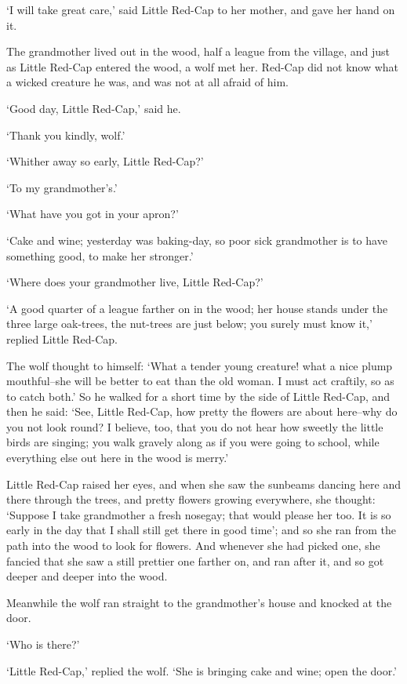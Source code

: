 \documentclass[oneside,11pt]{memoir} %
\begin{document}
`I will take great care,' said Little Red-Cap to her mother, and gave her hand on it.

The grandmother lived out in the wood, half a league from the village, and just as Little Red-Cap entered the wood, a wolf met her. Red-Cap did not know what a wicked creature he was, and was not at all afraid of him.

`Good day, Little Red-Cap,' said he.

`Thank you kindly, wolf.'

`Whither away so early, Little Red-Cap?'

`To my grandmother's.'

`What have you got in your apron?'

`Cake and wine; yesterday was baking-day, so poor sick grandmother is to have something good, to make her stronger.'

`Where does your grandmother live, Little Red-Cap?'

`A good quarter of a league farther on in the wood; her house stands under the three large oak-trees, the nut-trees are just below; you surely must know it,' replied Little Red-Cap.

The wolf thought to himself: `What a tender young creature! what a nice plump mouthful--she will be better to eat than the old woman. I must act craftily, so as to catch both.' So he walked for a short time by the side of Little Red-Cap, and then he said: `See, Little Red-Cap, how pretty the flowers are about here--why do you not look round? I believe, too, that you do not hear how sweetly the little birds are singing; you walk gravely along as if you were going to school, while everything else out here in the wood is merry.'

Little Red-Cap raised her eyes, and when she saw the sunbeams dancing here and there through the trees, and pretty flowers growing everywhere, she thought: `Suppose I take grandmother a fresh nosegay; that would please her too. It is so early in the day that I shall still get there in good time'; and so she ran from the path into the wood to look for flowers. And whenever she had picked one, she fancied that she saw a still prettier one farther on, and ran after it, and so got deeper and deeper into the wood.

Meanwhile the wolf ran straight to the grandmother's house and knocked at the door.

`Who is there?'

`Little Red-Cap,' replied the wolf. `She is bringing cake and wine; open the door.'
\end{document}
